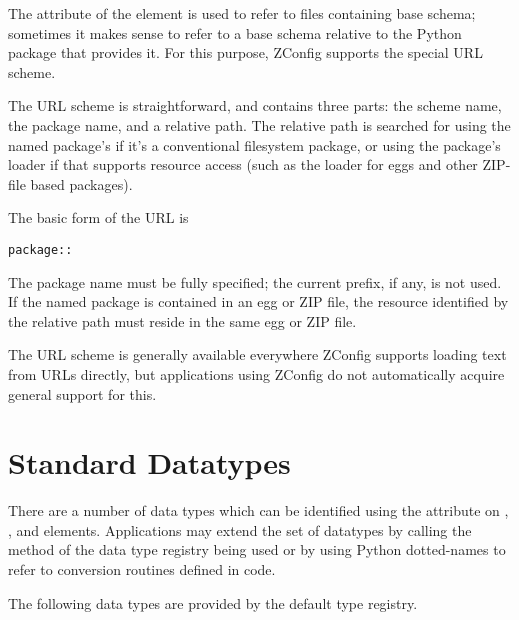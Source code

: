 \documentclass{howto}
\begin{document}
The  attribute of the  element is
used to refer to files containing base schema; sometimes it makes
sense to refer to a base schema relative to the Python package that
provides it.  For this purpose, ZConfig supports the special
 URL scheme.

The  URL scheme is straightforward, and contains three
parts: the scheme name, the package name, and a relative path.  The
relative path is searched for using the named package's
 if it's a conventional filesystem package, or using
the package's loader if that supports resource access (such as the
loader for eggs and other ZIP-file based packages).

The basic form of the  URL is

\begin{alltt}
package::
\end{alltt}

The package name must be fully specified; the current prefix, if any,
is not used.  If the named package is contained in an egg or ZIP file,
the resource identified by the relative path must reside in the same
egg or ZIP file.

The  URL scheme is generally available everywhere
ZConfig supports loading text from URLs directly, but applications
using ZConfig do not automatically acquire general support for this.


\section{Standard  Datatypes\label{standard-datatypes}}

There are a number of data types which can be identified using the
 attribute on ,
, and  elements.
Applications may extend the set of datatypes by calling the
 method of the data type registry being used or by
using Python dotted-names to refer to conversion routines defined in
code.

The following data types are provided by the default type registry.
\end{document}
